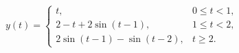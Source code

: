 \[y(t)=\begin{cases}t,&0\le t<1,\\2-t+2\sin(t-1),&1\le t<2,\\2\sin(t-1)-\sin(t-2),&t\ge2.\end{cases}\]
